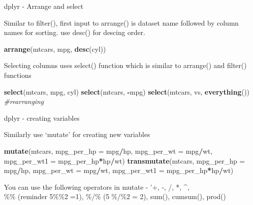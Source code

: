 \documentclass[ignorenonframetext,]{beamer}
\newenvironment{Shaded}{\begin{snugshade}}{\end{snugshade}}
\newcommand{\CommentTok}[1]{\textcolor[rgb]{0.56,0.35,0.01}{\textit{#1}}}
\newcommand{\DataTypeTok}[1]{\textcolor[rgb]{0.13,0.29,0.53}{#1}}
\newcommand{\KeywordTok}[1]{\textcolor[rgb]{0.13,0.29,0.53}{\textbf{#1}}}
\newcommand{\NormalTok}[1]{#1}
\newcommand{\OperatorTok}[1]{\textcolor[rgb]{0.81,0.36,0.00}{\textbf{#1}}}
\begin{document}
\begin{frame}[fragile]{dplyr - Arrange and select}
\protect\hypertarget{dplyr---arrange-and-select}{}

Similar to filter(), first input to arrange() is dataset name followed
by column names for sorting. use desc() for descing order.

\begin{Shaded}
\begin{Highlighting}[]
\KeywordTok{arrange}\NormalTok{(mtcars, mpg, }\KeywordTok{desc}\NormalTok{(cyl))}
\end{Highlighting}
\end{Shaded}

Selecting columns uses select() function which is similar to arrange()
and filter() functions

\begin{Shaded}
\begin{Highlighting}[]
\KeywordTok{select}\NormalTok{(mtcars, mpg, cyl)}
\KeywordTok{select}\NormalTok{(mtcars, }\OperatorTok{-}\NormalTok{mpg)}
\KeywordTok{select}\NormalTok{(mtcars, vs, }\KeywordTok{everything}\NormalTok{()) }\CommentTok{#rearranging}
\end{Highlighting}
\end{Shaded}

\end{frame}

\begin{frame}[fragile]{dplyr - creating variables}
\protect\hypertarget{dplyr---creating-variables}{}

Similarly use `mutate' for creating new variables

\begin{Shaded}
\begin{Highlighting}[]
\KeywordTok{mutate}\NormalTok{(mtcars, }\DataTypeTok{mpg_per_hp =}\NormalTok{ mpg}\OperatorTok{/}\NormalTok{hp, }\DataTypeTok{mpg_per_wt =}\NormalTok{ mpg}\OperatorTok{/}\NormalTok{wt, }
       \DataTypeTok{mpg_per_wt1 =}\NormalTok{ mpg_per_hp}\OperatorTok{*}\NormalTok{hp}\OperatorTok{/}\NormalTok{wt)}
\KeywordTok{transmutate}\NormalTok{(mtcars, }\DataTypeTok{mpg_per_hp =}\NormalTok{ mpg}\OperatorTok{/}\NormalTok{hp, }\DataTypeTok{mpg_per_wt =}\NormalTok{ mpg}\OperatorTok{/}\NormalTok{wt, }
       \DataTypeTok{mpg_per_wt1 =}\NormalTok{ mpg_per_hp}\OperatorTok{*}\NormalTok{hp}\OperatorTok{/}\NormalTok{wt)}
\end{Highlighting}
\end{Shaded}

You can use the following operators in mutate - '+, -, /, *, \^{},\\
\%\% (reminder 5\%\%2 =1), \%/\% (5 \%/\%2 = 2), sum(), cumsum(), prod()

\end{frame}
\end{document}
